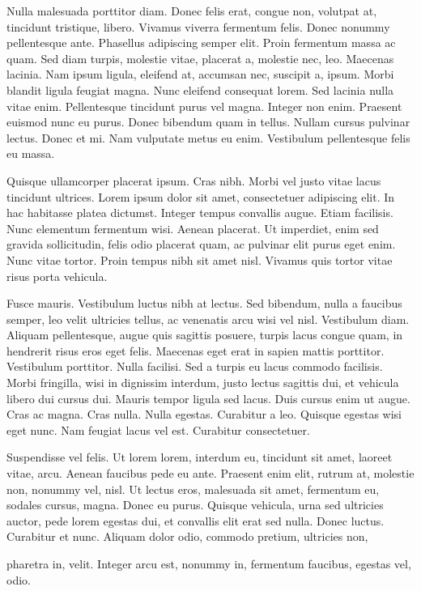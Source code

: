 \documentclass[12pt,a4paper,twoside,openright]{report}
\begin{document}
Nulla malesuada porttitor diam. Donec felis erat, congue non, volutpat at, tincidunt tristique, libero. Vivamus viverra fermentum felis. Donec nonummy pellentesque ante. Phasellus adipiscing semper elit. Proin fermentum massa ac quam. Sed diam turpis, molestie vitae, placerat a, molestie nec, leo. Maecenas lacinia. Nam ipsum ligula, eleifend at, accumsan nec, suscipit a, ipsum. Morbi blandit ligula feugiat magna. Nunc eleifend consequat lorem. Sed lacinia nulla vitae enim. Pellentesque tincidunt purus vel magna. Integer non enim. Praesent euismod nunc eu purus. Donec bibendum quam in tellus. Nullam cursus pulvinar lectus. Donec et mi. Nam vulputate metus eu enim. Vestibulum pellentesque felis eu massa.

Quisque ullamcorper placerat ipsum. Cras nibh. Morbi vel justo vitae lacus tincidunt ultrices. Lorem ipsum dolor sit amet, consectetuer adipiscing elit. In hac habitasse platea dictumst. Integer tempus convallis augue. Etiam facilisis. Nunc elementum fermentum wisi. Aenean placerat. Ut imperdiet, enim sed gravida sollicitudin, felis odio placerat quam, ac pulvinar elit purus eget enim. Nunc vitae tortor. Proin tempus nibh sit amet nisl. Vivamus quis tortor vitae risus porta vehicula.

Fusce mauris. Vestibulum luctus nibh at lectus. Sed bibendum, nulla a faucibus semper, leo velit ultricies tellus, ac venenatis arcu wisi vel nisl. Vestibulum diam. Aliquam pellentesque, augue quis sagittis posuere, turpis lacus congue quam, in hendrerit risus eros eget felis. Maecenas eget erat in sapien mattis porttitor. Vestibulum porttitor. Nulla facilisi. Sed a turpis eu lacus commodo facilisis. Morbi fringilla, wisi in dignissim interdum, justo lectus sagittis dui, et vehicula libero dui cursus dui. Mauris tempor ligula sed lacus. Duis cursus enim ut augue. Cras ac magna. Cras nulla. Nulla egestas. Curabitur a leo. Quisque egestas wisi eget nunc. Nam feugiat lacus vel est. Curabitur consectetuer.

Suspendisse vel felis. Ut lorem lorem, interdum eu, tincidunt sit amet, laoreet vitae, arcu. Aenean faucibus pede eu ante. Praesent enim elit, rutrum at, molestie non, nonummy vel, nisl. Ut lectus eros, malesuada sit amet, fermentum eu, sodales cursus, magna. Donec eu purus. Quisque vehicula, urna sed ultricies auctor, pede lorem egestas dui, et convallis elit erat sed nulla. Donec luctus. Curabitur et nunc. Aliquam dolor odio, commodo pretium, ultricies non,

\newpage
pharetra in, velit. Integer arcu est, nonummy in, fermentum faucibus, egestas vel, odio.
\end{document}
